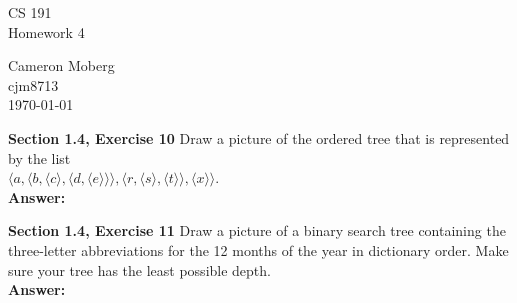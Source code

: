 \documentclass[12pt]{article}
\begin{document}
\begin{center}
{\large CS 191}\\
Homework 4
\end{center}

\begin{flushright}
Cameron Moberg\\
cjm8713 \\
\today
\end{flushright}

   \textbf{Section 1.4, Exercise 10}  Draw a picture of the ordered tree that is represented by the list \\
   $\langle a, \langle b, \langle c \rangle,\langle d,\langle e\rangle\rangle\rangle,\langle r,\langle s \rangle , \langle t \rangle \rangle , \langle x \rangle\rangle$. \\
  \textbf{Answer:}\\


\begin{center}
\end{center}


   \textbf{Section 1.4, Exercise 11}  Draw a picture of a binary search tree containing the three-letter abbreviations
for the 12 months of the year in dictionary order.  Make sure your tree has the least possible depth.\\
  \textbf{Answer:}\\
\end{document}
